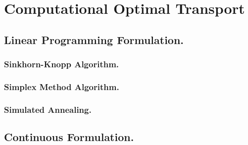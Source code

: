 \chapter{Computational Optimal Transport}
\section{Linear Programming Formulation.}
\subsection{Sinkhorn-Knopp Algorithm.}
\subsection{Simplex Method Algorithm.}
\subsection{Simulated Annealing.}
\section{Continuous Formulation.}
